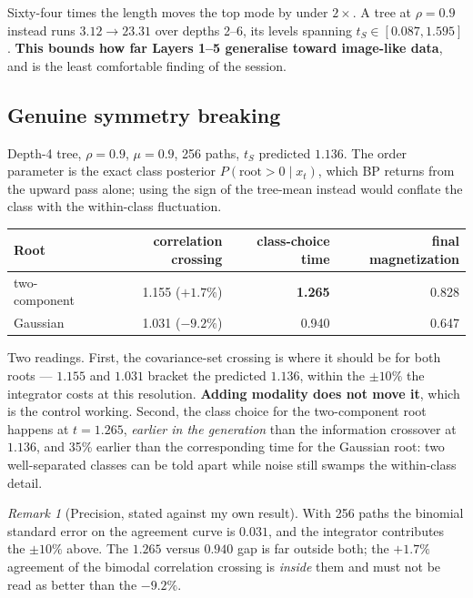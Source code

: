 \documentclass[11pt]{article}
\theoremstyle{remark}
\newtheorem{remark}{Remark}
\begin{document}
Sixty-four times the length moves the top mode by under $2\times$. A tree at
$\rho=0.9$ instead runs $3.12 \to 23.31$ over depths 2--6, its levels spanning
$t_S \in [0.087, 1.595]$. \textbf{This bounds how far Layers 1--5 generalise
toward image-like data}, and is the least comfortable finding of the session.

\subsection{Genuine symmetry breaking}
\label{sec:symmetry}

Depth-4 tree, $\rho=0.9$, $\mu=0.9$, 256 paths, $t_S$ predicted $1.136$. The
order parameter is the exact class posterior $P(\text{root}>0 \mid x_t)$, which
BP returns from the upward pass alone; using the sign of the tree-mean instead
would conflate the class with the within-class fluctuation.

\begin{center}
\begin{tabular}{@{}lrrr@{}}
\toprule
Root & correlation crossing & class-choice time & final magnetization \\
\midrule
two-component & 1.155 ($+1.7\%$) & \textbf{1.265} & 0.828 \\
Gaussian & 1.031 ($-9.2\%$) & 0.940 & 0.647 \\
\bottomrule
\end{tabular}
\end{center}

Two readings. First, the covariance-set crossing is where it should be for both
roots --- $1.155$ and $1.031$ bracket the predicted $1.136$, within the $\pm10\%$
the integrator costs at this resolution. \textbf{Adding modality does not move
it}, which is the control working. Second, the class choice for the
two-component root happens at $t=1.265$, \emph{earlier in the generation} than
the information crossover at $1.136$, and 35\% earlier than the corresponding
time for the Gaussian root: two well-separated classes can be told apart while
noise still swamps the within-class detail.

\begin{remark}[Precision, stated against my own result]
With 256 paths the binomial standard error on the agreement curve is $0.031$,
and the integrator contributes the $\pm10\%$ above. The $1.265$ versus $0.940$
gap is far outside both; the $+1.7\%$ agreement of the bimodal correlation
crossing is \emph{inside} them and must not be read as better than the $-9.2\%$.
\end{remark}
\end{document}
